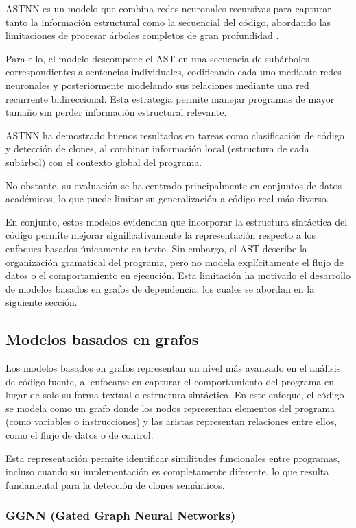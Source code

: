 ASTNN es un modelo que combina redes neuronales recursivas para capturar tanto la información estructural como la secuencial del código, abordando las limitaciones de procesar árboles completos de gran profundidad \cite{Zhang2019ASTNeural}.

Para ello, el modelo descompone el AST en una secuencia de subárboles correspondientes a sentencias individuales, codificando cada uno mediante redes neuronales y posteriormente modelando sus relaciones mediante una red recurrente bidireccional. Esta estrategia permite manejar programas de mayor tamaño sin perder información estructural relevante.

ASTNN ha demostrado buenos resultados en tareas como clasificación de código y detección de clones, al combinar información local (estructura de cada subárbol) con el contexto global del programa.

No obstante, su evaluación se ha centrado principalmente en conjuntos de datos académicos, lo que puede limitar su generalización a código real más diverso.

En conjunto, estos modelos evidencian que incorporar la estructura sintáctica del código permite mejorar significativamente la representación respecto a los enfoques basados únicamente en texto. Sin embargo, el AST describe la organización gramatical del programa, pero no modela explícitamente el flujo de datos o el comportamiento en ejecución. Esta limitación ha motivado el desarrollo de modelos basados en grafos de dependencia, los cuales se abordan en la siguiente sección.

\subsection{Modelos basados en grafos}

Los modelos basados en grafos representan un nivel más avanzado en el análisis de código fuente, al enfocarse en capturar el comportamiento del programa en lugar de solo su forma textual o estructura sintáctica. En este enfoque, el código se modela como un grafo donde los nodos representan elementos del programa (como variables o instrucciones) y las aristas representan relaciones entre ellos, como el flujo de datos o de control.

Esta representación permite identificar similitudes funcionales entre programas, incluso cuando su implementación es completamente diferente, lo que resulta fundamental para la detección de clones semánticos.

\subsubsection{GGNN (Gated Graph Neural Networks)}


